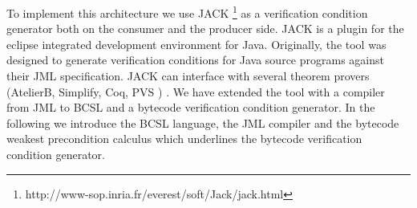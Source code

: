 To implement this architecture we use JACK \footnote{ http://www-sop.inria.fr/everest/soft/Jack/jack.html} as a verification condition generator both on the consumer and the
producer side. JACK is a plugin for the eclipse  integrated development environment for Java. Originally, the tool was designed to generate verification conditions for Java source programs against their JML specification. JACK can interface with several theorem provers (AtelierB, Simplify, Coq, PVS ) . We have extended the tool with a compiler from JML to BCSL and a bytecode verification condition generator. In the following we introduce the BCSL language, the JML compiler and the bytecode weakest precondition calculus which underlines the bytecode verification condition generator.
 
